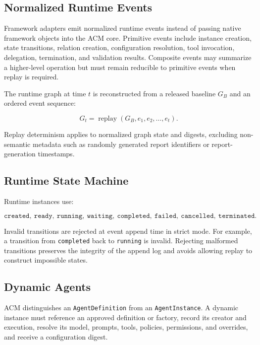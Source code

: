 \documentclass[10pt]{article}
\begin{document}
\subsection{Normalized Runtime Events}

Framework adapters emit normalized runtime events instead of passing native framework objects into the ACM core. Primitive events include instance creation, state transitions, relation creation, configuration resolution, tool invocation, delegation, termination, and validation results. Composite events may summarize a higher-level operation but must remain reducible to primitive events when replay is required.

The runtime graph at time $t$ is reconstructed from a released baseline $G_B$ and an ordered event sequence:

\begin{equation}
G_t=\operatorname{replay}(G_B,e_1,e_2,\ldots,e_t).
\end{equation}

Replay determinism applies to normalized graph state and digests, excluding non-semantic metadata such as randomly generated report identifiers or report-generation timestamps.

\subsection{Runtime State Machine}

Runtime instances use:

\[
\texttt{created},\ \texttt{ready},\ \texttt{running},\ \texttt{waiting},\ \texttt{completed},\ \texttt{failed},\ \texttt{cancelled},\ \texttt{terminated}.
\]

Invalid transitions are rejected at event append time in strict mode. For example, a transition from \texttt{completed} back to \texttt{running} is invalid. Rejecting malformed transitions preserves the integrity of the append log and avoids allowing replay to construct impossible states.

\subsection{Dynamic Agents}

ACM distinguishes an \texttt{AgentDefinition} from an \texttt{AgentInstance}. A dynamic instance must reference an approved definition or factory, record its creator and execution, resolve its model, prompts, tools, policies, permissions, and overrides, and receive a configuration digest.
\end{document}
